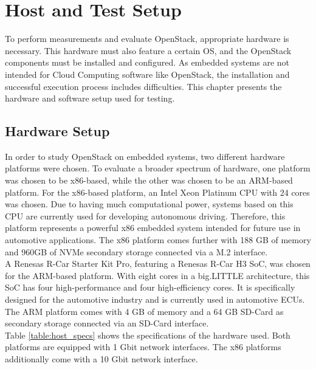 \chapter{Host and Test Setup}
\label{chapter:host_and_Test_setup}

    To perform measurements and evaluate OpenStack, appropriate hardware is necessary.
    This hardware must also feature a certain OS, and the OpenStack components must be installed and configured.
    As embedded systems are not intended for Cloud Computing software like OpenStack, the installation and successful execution process includes difficulties.
    This chapter presents the hardware and software setup used for testing.
    
    
    \section{Hardware Setup}
    \label{section:hardware_setup}
        
        In order to study OpenStack on embedded systems, two different hardware platforms were chosen.
        To evaluate a broader spectrum of hardware, one platform was chosen to be x86-based, while the other was chosen to be an ARM-based platform.
        For the x86-based platform, an Intel Xeon Platinum \ac{CPU} with 24 cores was chosen.
        Due to having much computational power, systems based on this \ac{CPU} are currently used for developing autonomous driving.
        Therefore, this platform represents a powerful x86 embedded system intended for future use in automotive applications.
        The x86 platform comes further with 188 GB of memory and 960GB of NVMe secondary storage connected via a M.2 interface.\\
        A Renesas R-Car Starter Kit Pro, featuring a Renesas R-Car H3 SoC, was chosen for the ARM-based platform.
        With eight cores in a big.LITTLE architecture, this \ac{SoC} has four high-performance and four high-efficiency cores.
        It is specifically designed for the automotive industry and is currently used in automotive \acp{ECU}.
        The ARM platform comes with 4 GB of memory and a 64 GB SD-Card as secondary storage connected via an SD-Card interface.\\
        Table \ref{table:host_specs} shows the specifications of the hardware used.
        Both platforms are equipped with 1 Gbit network interfaces.
        The x86 platforms additionally come with a 10 Gbit network interface.

